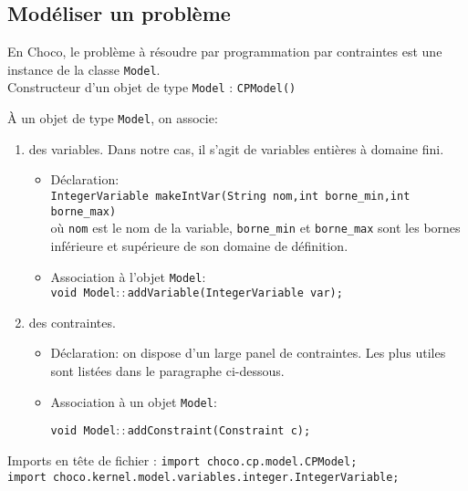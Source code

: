 \subsection*{Modéliser un problème}
En Choco, le problème à résoudre par programmation par contraintes est une instance de la classe \texttt{Model}.\\
Constructeur d'un objet de type \texttt{Model} : \texttt{CPModel()}

\`A un objet de type \texttt{Model}, on associe:
\begin{enumerate}

\item des variables. Dans notre cas, il s'agit de variables entières à domaine
      fini.

  \begin{itemize}

  \item Déclaration:\\
  \hspace{0.5 cm} \texttt{IntegerVariable makeIntVar(String nom,int borne\_min,int borne\_max)}\\
     où \texttt{nom} est le nom de la variable, \texttt{borne\_min} et
     \texttt{borne\_max} sont les bornes inférieure et supérieure de son domaine
     de définition.

  \item Association à l'objet \texttt{Model}:\\
  \hspace{0.5 cm} \texttt{void Model$\colon\colon$addVariable(IntegerVariable var);}
  \end{itemize}

  \item des contraintes.

  \begin{itemize}
  \item Déclaration: on dispose d'un large panel de contraintes. Les plus
        utiles sont listées dans le paragraphe ci-dessous.

  \item Association à un objet \texttt{Model}:

  \hspace{0.5 cm} \texttt{void Model$\colon\colon$addConstraint(Constraint c);}
  \end{itemize}

\end{enumerate}

Imports en tête de fichier : \texttt{import choco.cp.model.CPModel;}\\
\texttt{import choco.kernel.model.variables.integer.IntegerVariable;}


